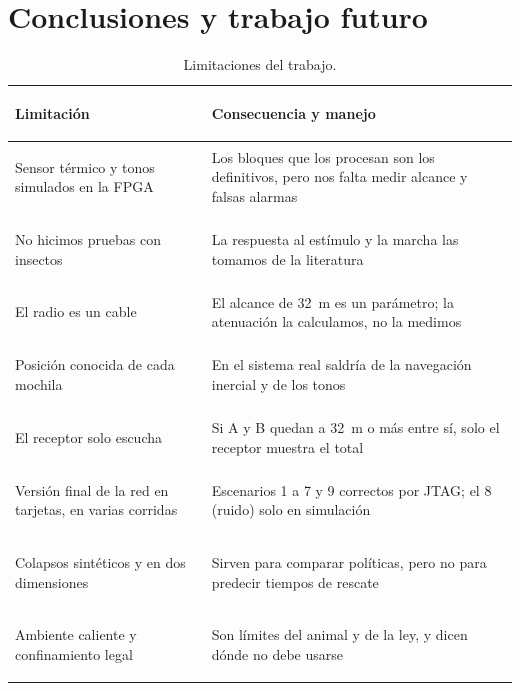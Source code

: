 \section{Conclusiones y trabajo futuro}
\label{sec:conclusiones}

\begin{table}[!htb]
\centering\footnotesize
\caption{Limitaciones del trabajo.}
\label{tab:riesgos}
\begin{tabularx}{\textwidth}{@{}>{\bfseries\raggedright\arraybackslash}p{5.0cm} >{\raggedright\arraybackslash}X@{}}
\toprule
\rowcolor{TableHead} Limitación & Consecuencia y manejo \\
\midrule
Sensor térmico y tonos simulados en la FPGA & Los bloques que los procesan son los definitivos, pero nos falta medir alcance y falsas alarmas \\
No hicimos pruebas con insectos & La respuesta al estímulo y la marcha las tomamos de la literatura \\
El radio es un cable & El alcance de 32~m es un parámetro; la atenuación la calculamos, no la medimos \\
Posición conocida de cada mochila & En el sistema real saldría de la navegación inercial y de los tonos \\
El receptor solo escucha & Si A y B quedan a 32~m o más entre sí, solo el receptor muestra el total \\
Versión final de la red en tarjetas, en varias corridas & Escenarios 1 a 7 y 9 correctos por JTAG; el 8 (ruido) solo en simulación \\
Colapsos sintéticos y en dos dimensiones & Sirven para comparar políticas, pero no para predecir tiempos de rescate \\
Ambiente caliente y confinamiento legal & Son límites del animal y de la ley, y dicen dónde no debe usarse \\
\bottomrule
\end{tabularx}
\end{table}


